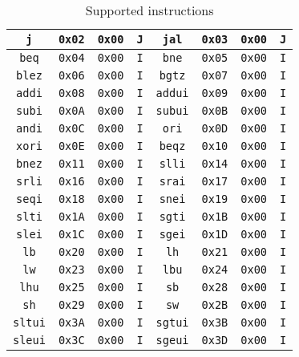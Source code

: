 \begin{table}[!ht]
\begin{tabular}{ |c|c|c|c||c|c|c|c| }
        \hline
        \verb|j| & \verb|0x02| & \verb|0x00| & \verb|J| & \verb|jal| & \verb|0x03| & \verb|0x00| & \verb|J| \\
        \hline
        \verb|beq| & \verb|0x04| & \verb|0x00| & \verb|I| & \verb|bne| & \verb|0x05| & \verb|0x00| & \verb|I| \\
        \hline
        \verb|blez| & \verb|0x06| & \verb|0x00| & \verb|I| & \verb|bgtz| & \verb|0x07| & \verb|0x00| & \verb|I| \\
        \hline
        \verb|addi| & \verb|0x08| & \verb|0x00| & \verb|I| & \verb|addui| & \verb|0x09| & \verb|0x00| & \verb|I| \\
        \hline
        \verb|subi| & \verb|0x0A| & \verb|0x00| & \verb|I| & \verb|subui| & \verb|0x0B| & \verb|0x00| & \verb|I| \\
        \hline
        \verb|andi| & \verb|0x0C| & \verb|0x00| & \verb|I| & \verb|ori| & \verb|0x0D| & \verb|0x00| & \verb|I| \\
        \hline
        \verb|xori| & \verb|0x0E| & \verb|0x00| & \verb|I| & \verb|beqz| & \verb|0x10| & \verb|0x00| & \verb|I| \\
        \hline
        \verb|bnez| & \verb|0x11| & \verb|0x00| & \verb|I| & \verb|slli| & \verb|0x14| & \verb|0x00| & \verb|I| \\
        \hline
        \verb|srli| & \verb|0x16| & \verb|0x00| & \verb|I| & \verb|srai| & \verb|0x17| & \verb|0x00| & \verb|I| \\
        \hline
        \verb|seqi| & \verb|0x18| & \verb|0x00| & \verb|I| & \verb|snei| & \verb|0x19| & \verb|0x00| & \verb|I| \\
        \hline
        \verb|slti| & \verb|0x1A| & \verb|0x00| & \verb|I| & \verb|sgti| & \verb|0x1B| & \verb|0x00| & \verb|I| \\
        \hline
        \verb|slei| & \verb|0x1C| & \verb|0x00| & \verb|I| & \verb|sgei| & \verb|0x1D| & \verb|0x00| & \verb|I| \\
        \hline
        \verb|lb| & \verb|0x20| & \verb|0x00| & \verb|I| & \verb|lh| & \verb|0x21| & \verb|0x00| & \verb|I| \\
        \hline
        \verb|lw| & \verb|0x23| & \verb|0x00| & \verb|I| & \verb|lbu| & \verb|0x24| & \verb|0x00| & \verb|I| \\
        \hline
        \verb|lhu| & \verb|0x25| & \verb|0x00| & \verb|I| & \verb|sb| & \verb|0x28| & \verb|0x00| & \verb|I| \\
        \hline
        \verb|sh| & \verb|0x29| & \verb|0x00| & \verb|I|  & \verb|sw| & \verb|0x2B| & \verb|0x00| & \verb|I| \\
        \hline
        \verb|sltui| & \verb|0x3A| & \verb|0x00| & \verb|I| & \verb|sgtui| & \verb|0x3B| & \verb|0x00| & \verb|I| \\
        \hline
        \verb|sleui| & \verb|0x3C| & \verb|0x00| & \verb|I| & \verb|sgeui| & \verb|0x3D| & \verb|0x00| & \verb|I| \\
        \hline
    \end{tabular}
    \caption{Supported instructions}
    \label{tab:sup_instr}
\end{table}

